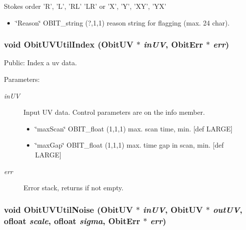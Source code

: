 Stokes order 'R', 'L', 'RL' 'LR' or 'X', 'Y', 'XY', 'YX' \begin{itemize}
\item \char`\"{}Reason\char`\"{} OBIT\_\-string (?,1,1) reason string for flagging (max. 24 char). 
\end{itemize}
\subsubsection{\setlength{\rightskip}{0pt plus 5cm}void Obit\-UVUtil\-Index ({\bf Obit\-UV} $\ast$ {\em in\-UV}, {\bf Obit\-Err} $\ast$ {\em err})}\label{ObitUVUtil_8h_a4}


Public: Index a uv data. 

\begin{Desc}
\item[Parameters:]
\begin{description}
\item[{\em in\-UV}]Input UV data. Control parameters are on the info member. \begin{itemize}
\item \char`\"{}max\-Scan\char`\"{} OBIT\_\-float (1,1,1) max. scan time, min. [def LARGE] \item \char`\"{}max\-Gap\char`\"{} OBIT\_\-float (1,1,1) max. time gap in scan, min. [def LARGE] \end{itemize}
\item[{\em err}]Error stack, returns if not empty. \end{description}
\end{Desc}
\subsubsection{\setlength{\rightskip}{0pt plus 5cm}void Obit\-UVUtil\-Noise ({\bf Obit\-UV} $\ast$ {\em in\-UV}, {\bf Obit\-UV} $\ast$ {\em out\-UV}, {\bf ofloat} {\em scale}, {\bf ofloat} {\em sigma}, {\bf Obit\-Err} $\ast$ {\em err})}\label{ObitUVUtil_8h_a11}


